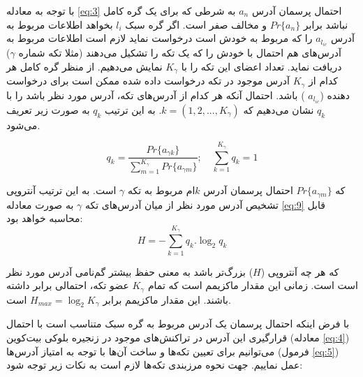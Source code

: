 با توجه به معادله \eqref{eq:3} احتمال پرسمان آدرس $a_n$ به شرطی که برای یک گره کامل نباشد برابر $Pr\{{a_n}\}$ و مخالف صفر است. اگر گره سبک $l_i$ بخواهد اطلاعات مربوط به آدرس $a_{l_{ic}}$ را که مربوط به خودش است درخواست نماید لازم است اطلاعات مربوط به آدرس‌های هم احتمال با خودش را که یک تکه‌ را تشکیل می‌دهند (مثلا تکه شماره $\gamma$) دریافت نماید. تعداد اعضای این تکه را با $K_\gamma$ نمایش می‌دهیم. از منظر گره کامل هر کدام از $K_\gamma$  آدرس‌ موجود در تکه درخواست داده شده ممکن است برای درخواست دهنده ($a_{l_{ic}}$ ) باشد. احتمال آنکه هر کدام از آدرس‌های تکه، آدرس مورد نظر باشد را با $q_k$ نشان می‌دهیم که $k=(1, 2, ..., K_\gamma)$. به این ترتیب $q_k$ به صورت زیر تعریف می‌شود.

\begin{equation}
q_k = \frac{Pr\{a_{\gamma k}\}}{\sum_{m=1}^{K_\gamma}Pr\{a_{\gamma m}\}}; \quad \sum_{k=1}^{K_\gamma} q_k = 1
\label{eq:8}
\end{equation}

که $Pr\{a_{\gamma m}\}$ احتمال پرسمان آدرس $k$ام مربوط به تکه‌ $\gamma$ است. به این ترتیب آنتروپی تشخیص آدرس مورد نظر از میان آدرس‌های تکه $\gamma$ به صورت معادله \eqref{eq:9} قابل محاسبه خواهد بود:
\begin{equation}
H = -\sum_{k=1}^{K_\gamma} q_k . \log_2 q_k
\label{eq:9}
\end{equation}

که هر چه آنتروپی ($H$) بزرگ‌تر باشد به معنی حفظ بیشتر گم‌نامی آدرس مورد نظر است است. زمانی این مقدار ماکزیمم است که تمام $K_\gamma$ عضو تکه، احتمالی برابر داشته باشند. این مقدار ماکزیمم برابر $H_{max} = \log_2K_\gamma$ است.

با فرض اینکه احتمال پرسمان یک آدرس مربوط به گره سبک متناسب است با احتمال قرارگیری این آدرس در تراکنش‌های موجود در زنجیره بلوکی بیت‌کوین (معادله \eqref{eq:4}) می‌توانیم برای تعیین  تکه‌ها و ساخت آن‌ها با توجه به امتیاز آدرس‌ها (فرمول \eqref{eq:5}) عمل نماییم. جهت نحوه مرزبندی تکه‌ها لازم است به نکات زیر توجه شود:

